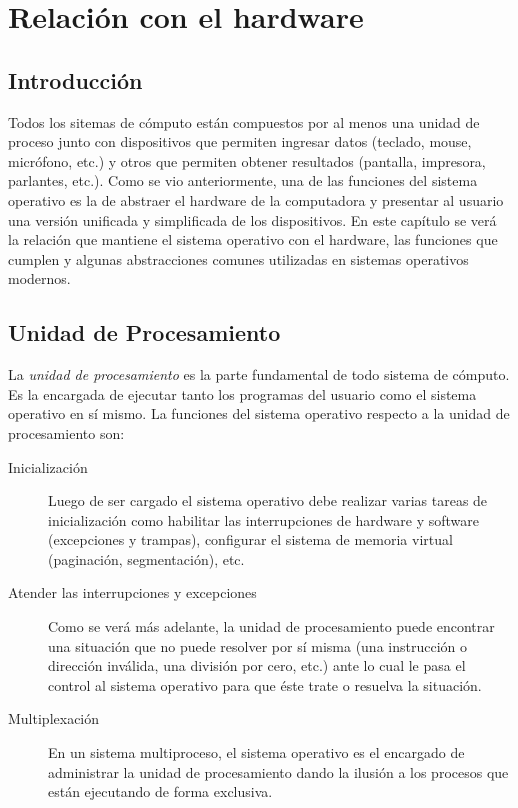 \documentclass[11pt,fleqn]{book} %
\begin{document}
\chapter{Relación con el hardware}
\label{sec-2}
\section{Introducción}
\label{sec-2-1}
\label{HW}


Todos los sitemas de cómputo están compuestos por al menos una unidad de proceso
junto con dispositivos que permiten ingresar datos  (teclado, mouse, micrófono, 
etc.) y otros que permiten obtener resultados (pantalla, impresora, parlantes, 
etc.). Como se vio anteriormente, una de las funciones del sistema operativo es la de 
abstraer el hardware de la computadora y presentar al usuario una 
versión unificada y simplificada de los dispositivos.  
En este capítulo se verá la relación que mantiene el sistema operativo 
con el hardware, las funciones que cumplen y algunas abstracciones
comunes utilizadas en sistemas operativos modernos.
\section{Unidad de Procesamiento}
\label{sec-2-2}


La \emph{unidad de procesamiento} es la parte fundamental de todo sistema de cómputo.
Es la encargada de ejecutar tanto los programas del usuario como el sistema 
operativo en sí mismo.  La funciones del sistema operativo respecto a la
unidad de procesamiento son: 

\begin{description}
\item[Inicialización] Luego de ser cargado el sistema operativo debe realizar 
                    varias tareas de inicialización como habilitar 
                    las interrupciones de hardware y software 
                    (excepciones y trampas), configurar el sistema de 
                    memoria virtual (paginación, segmentación), etc.
\item[Atender las interrupciones y excepciones] Como se verá más adelante, 
                     la unidad de procesamiento 
                     puede encontrar una situación que no puede resolver
                     por sí misma (una instrucción o dirección inválida, 
                     una división por cero, etc.) ante lo cual le pasa el
                     control al sistema operativo para que éste trate o
                     resuelva la situación.
\item[Multiplexación] En un sistema multiproceso, el sistema operativo es el 
                    encargado de administrar la unidad de procesamiento 
                    dando la ilusión a los procesos que están ejecutando 
                    de forma exclusiva.
\end{description}
\end{document}
